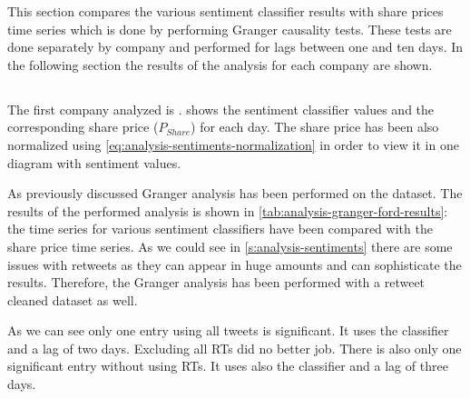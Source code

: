 This section compares the various sentiment classifier results with share prices time series which is done by performing Granger causality tests.
These tests are done separately by company and performed for lags between one and ten days.
In the following section the results of the analysis for each company are shown.

\subsection{\ford}
\label{ss:analysis-granger-ford}

The first company analyzed is \ford{}.
 shows the sentiment classifier values and the corresponding share price ($P_{Share}$) for each day.
The share price has been also normalized using \cref{eq:analysis-sentiments-normalization} in order to view it in one diagram with sentiment values.

\begin{figure}[hbt]
    \centering
    
    \caption{\resultsCaption{\ford}}
    \label{fig:analysis-results-ford}
\end{figure} 

As previously discussed Granger analysis has been performed on the dataset.
The results of the performed analysis is shown in \cref{tab:analysis-granger-ford-results}: 
the time series for various sentiment classifiers have been compared with the share price time series.
As we could see in \cref{s:analysis-sentiments} there are some issues with retweets as they can appear in huge amounts and can sophisticate the results.
Therefore, the Granger analysis has been performed with a retweet cleaned dataset as well.

As we can see only one entry using all tweets is significant.
It uses the \nb{} classifier and a lag of two days.
Excluding all \acp{RT} did no better job.
There is also only one significant entry without using \acp{RT}.
It uses also the \nb{} classifier and a lag of three days.

